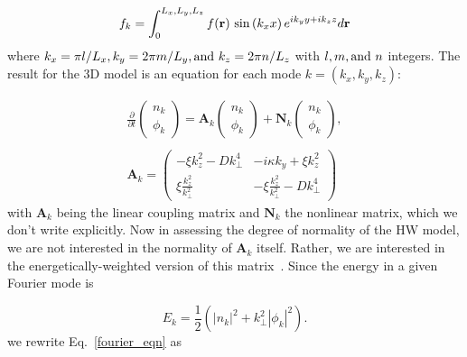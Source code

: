 \documentclass[letter,scriptaddress,twocolumn, prl,showkeys]{revtex4}
\def\beq{\begin{equation}}
\def\eeq{\end{equation}}
\def\beqar{\begin{eqnarray}}
\def\eeqar{\end{eqnarray}}
\begin{document}
\beq
\label{fourier_form}
f_k = \int_0^{L_x,L_y,L_z} f(\mathbf{r}) \ {\rm sin} \left( k_x x \right) e^{i k_y y + i k_z z} d\mathbf{r}
\eeq
where $k_x = \pi l/L_x, k_y = 2 \pi m/L_y, {\rm and } \ k_z = 2 \pi n/L_z$ with $l, m, {\rm and } \ n$ integers.
The result for the 3D model is an equation for each mode $k = (k_x,k_y,k_z)$:

\beqar
\label{fourier_eqn}
\frac{\partial}{\partial t} \left( \begin{array}{cc} n_k \\ \phi_k \end{array} \right) = \mathbf{A}_k \left( \begin{array}{cc} n_k \\ \phi_k \end{array} \right) + \mathbf{N}_k \left( \begin{array}{cc} n_k \\ \phi_k \end{array} \right), \\ \nonumber \\
\label{A_k}
\mathbf{A}_k = \left( \begin{array}{cc} -\xi k_z^2 - D k_\perp^4 & -i \kappa k_y + \xi k_z^2 \\  \xi \frac{k_z^2}{k_\perp^2} & - \xi \frac{k_z^2}{k_\perp^2} - D k_\perp^4\end{array} \right)
\eeqar
with $\mathbf{A}_k$ being the linear coupling matrix and $\mathbf{N}_k$ the nonlinear matrix, which we don't write explicitly. 
Now in assessing the degree of normality of the HW model, we are not interested in the normality of $\mathbf{A}_k$ itself. 
Rather, we are interested in the energetically-weighted version of this matrix~\cite{camargo1998,schmid2007,camporeale2010}. Since the energy in a given Fourier mode is

\beq
\label{en_def}
E_k =  \frac{1}{2} \left( |n_k|^2 + k_\perp^2 |\phi_k|^2 \right).
\eeq
we rewrite Eq.~\ref{fourier_eqn} as
\end{document}
